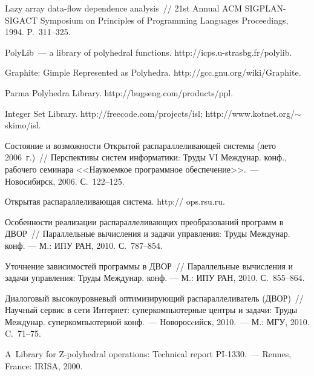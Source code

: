 \begin{multicols}{2}
{{\begin{thebibliography}{99}
Lazy array data-flow dependence analysis~// 21st Annual ACM SIGPLAN-SIGACT Symposium on 
Principles of Programming Languages Proceedings, 1994. P.~311--325.

 PolyLib~--- a library of polyhedral functions. 
{\sf http://icps.\linebreak u-strasbg.fr/polylib}.

 Graphite: Gimple Represented as Polyhedra.
{\sf http://gcc.\linebreak gnu.org/wiki/Graphite}.

 Parma Polyhedra Library.
{\sf http://bugseng.com/\linebreak products/ppl}.

 Integer Set Library.
{\sf http://freecode.com/projects/isl};
{\sf http://www.kotnet.org/$\sim$skimo/isl}.


  
Состояние и возможности Открытой распараллеливающей системы (лето 2006~г.)~// 
Перспективы систем информатики: Труды VI Междунар. конф., рабочего семинара 
<<Наукоемкое программное обеспечение>>.~--- Новосибирск, 2006. С.~122--125.

 Открытая распараллеливающая система.
{\sf http:// ops.rsu.ru}.

  
Особенности реализации распараллеливающих преобразований программ в ДВОР~// Параллельные 
вы\-чис\-ле\-ния и задачи управления: Труды Междунар. конф. --- М.: ИПУ РАН, 2010. С.~787--854.

  
Уточнение зависимостей программы в ДВОР~// Параллельные вычисления и задачи управления: Труды 
Междунар. конф. --- М.: ИПУ РАН, 2010. С.~855--864.

  
Диалоговый высокоуровневый оптимизирующий распараллеливатель (ДВОР)~// 
Научный сервис в сети Интернет: суперкомпьютерные центры и задачи: Труды Междунар. 
суперкомпьютерной конф.~--- Новоросcийск, 2010.~--- М.: МГУ, 2010. C.~71--75.

\label{end\stat}

  
A~Library for Z-polyhedral operations: Technical report PI-1330.~--- Rennes, France: IRISA, 2000.
\end{thebibliography}
}
}

\end{multicols}